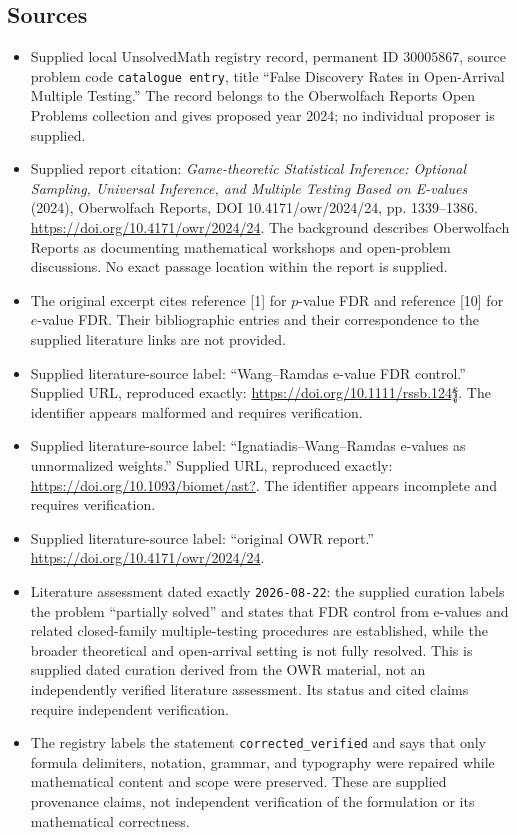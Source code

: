 \documentclass[11pt]{article}
\begin{document}
\subsection{Sources}
\begin{itemize}
\item Supplied local UnsolvedMath registry record, permanent ID \(30005867\), source problem code \texttt{catalogue entry}, title ``False Discovery Rates in Open-Arrival Multiple Testing.'' The record belongs to the Oberwolfach Reports Open Problems collection and gives proposed year 2024; no individual proposer is supplied.
\item Supplied report citation: \emph{Game-theoretic Statistical Inference: Optional Sampling, Universal Inference, and Multiple Testing Based on E-values} (2024), Oberwolfach Reports, DOI 10.4171/owr/2024/24, pp. 1339--1386. \url{https://doi.org/10.4171/owr/2024/24}. The background describes Oberwolfach Reports as documenting mathematical workshops and open-problem discussions. No exact passage location within the report is supplied.
\item The original excerpt cites reference [1] for \(p\)-value FDR and reference [10] for \(e\)-value FDR. Their bibliographic entries and their correspondence to the supplied literature links are not provided.
\item Supplied literature-source label: ``Wang--Ramdas e-value FDR control.'' Supplied URL, reproduced exactly: \url{https://doi.org/10.1111/rssb.124รู้}. The identifier appears malformed and requires verification.
\item Supplied literature-source label: ``Ignatiadis--Wang--Ramdas e-values as unnormalized weights.'' Supplied URL, reproduced exactly: \url{https://doi.org/10.1093/biomet/ast?}. The identifier appears incomplete and requires verification.
\item Supplied literature-source label: ``original OWR report.'' \url{https://doi.org/10.4171/owr/2024/24}.
\item Literature assessment dated exactly \texttt{2026-08-22}: the supplied curation labels the problem ``partially solved'' and states that FDR control from e-values and related closed-family multiple-testing procedures are established, while the broader theoretical and open-arrival setting is not fully resolved. This is supplied dated curation derived from the OWR material, not an independently verified literature assessment. Its status and cited claims require independent verification.
\item The registry labels the statement \texttt{corrected\_verified} and says that only formula delimiters, notation, grammar, and typography were repaired while mathematical content and scope were preserved. These are supplied provenance claims, not independent verification of the formulation or its mathematical correctness.
\end{itemize}
\end{document}
